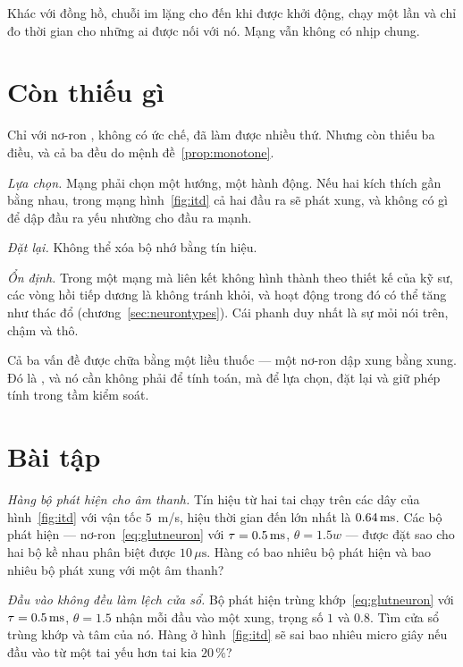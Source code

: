 Khác với đồng hồ, chuỗi im lặng cho đến khi được khởi động, chạy một lần và chỉ đo thời gian cho những ai được nối với nó. Mạng vẫn không có nhịp chung.

\section{Còn thiếu gì}

Chỉ với nơ-ron , không có ức chế, đã làm được nhiều thứ. Nhưng còn thiếu ba điều, và cả ba đều do mệnh đề~\ref{prop:monotone}.

\emph{Lựa chọn.} Mạng phải chọn một hướng, một hành động. Nếu hai kích thích gần bằng nhau, trong mạng hình~\ref{fig:itd} cả hai đầu ra sẽ phát xung, và không có gì để dập đầu ra yếu nhường cho đầu ra mạnh.

\emph{Đặt lại.} Không thể xóa bộ nhớ bằng tín hiệu.

\emph{Ổn định.} Trong một mạng mà liên kết không hình thành theo thiết kế của kỹ sư, các vòng hồi tiếp dương là không tránh khỏi, và hoạt động trong đó có thể tăng như thác đổ (chương~\ref{sec:neurontypes}). Cái phanh duy nhất là sự mỏi nói trên, chậm và thô.

Cả ba vấn đề được chữa bằng một liều thuốc --- một nơ-ron dập xung bằng xung. Đó là , và nó cần không phải để tính toán, mà để lựa chọn, đặt lại và giữ phép tính trong tầm kiểm soát.

\section{Bài tập}

\begin{exercise}[\lvlA]
\label{ex:02:1}
\emph{Hàng bộ phát hiện cho âm thanh.} Tín hiệu từ hai tai chạy trên các dây của hình~\ref{fig:itd} với vận tốc $5$~m/s, hiệu thời gian đến lớn nhất là $0.64\,\text{ms}$. Các bộ phát hiện --- nơ-ron~\eqref{eq:glutneuron} với $\tau=0.5\,\text{ms}$, $\theta=1.5w$ --- được đặt sao cho hai bộ kề nhau phân biệt được $10\,\mu\text{s}$. Hàng có bao nhiêu bộ phát hiện và bao nhiêu bộ phát xung với một âm thanh?
\end{exercise}

\begin{exercise}[\lvlB]
\label{ex:02:2}
\emph{Đầu vào không đều làm lệch cửa sổ.} Bộ phát hiện trùng khớp~\eqref{eq:glutneuron} với $\tau=0.5\,\text{ms}$, $\theta=1.5$ nhận mỗi đầu vào một xung, trọng số $1$ và $0.8$. Tìm cửa sổ trùng khớp và tâm của nó. Hàng ở hình~\ref{fig:itd} sẽ sai bao nhiêu micro giây nếu đầu vào từ một tai yếu hơn tai kia $20\,\%$?
\end{exercise}

